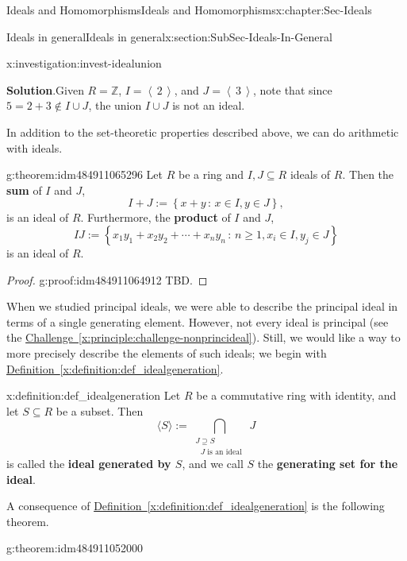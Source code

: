 \documentclass[oneside,10pt,]{book}
\newcommand{\blocktitlefont}{\relax}
\newcommand{\xreffont}{\relax}
\newcommand{\terminology}[1]{\textbf{#1}}
\numberwithin{equation}{section}
\renewcommand{\ge}{\geqslant}
\newcommand{\ideal}[1]{\left\langle\, #1 \,\right\rangle}
\newcommand{\setof}[2]{{\left\{#1\,\colon\,#2\right\}}}
\def\Z{{\mathbb Z}}
\begin{document}
\begin{chapterptx}{Ideals and Homomorphisms}{}{Ideals and Homomorphisms}{}{}{x:chapter:Sec-Ideals}
\begin{sectionptx}{Ideals in general}{}{Ideals in general}{}{}{x:section:SubSec-Ideals-In-General}
\begin{investigation}{}{x:investigation:invest-idealunion}
\par\smallskip%
\noindent\textbf{\blocktitlefont Solution}.\hypertarget{g:solution:idm484911070128}{}\quad{}Given \(R = \Z\), \(I = \ideal{2}\), and \(J = \ideal{3}\), note that since \(5 = 2 + 3\notin I\cup J\), the union \(I\cup J\) is not an ideal.%
\end{investigation}
In addition to the set-theoretic properties described above, we can do arithmetic with ideals.%
\begin{theorem}{}{}{g:theorem:idm484911065296}%
Let \(R\) be a ring and \(I,J\subseteq R\) ideals of \(R\). Then the \terminology{sum} of \(I\) and \(J\),%
\begin{equation*}
I+J := \setof{x+y}{x\in I, y\in J},
\end{equation*}
is an ideal of \(R\). Furthermore, the \terminology{product} of \(I\) and \(J\),%
\begin{equation*}
IJ := \setof{x_1 y_1 + x_2 y_2 + \cdots + x_n y_n}{n\ge 1, x_i \in I, y_j\in J}
\end{equation*}
is an ideal of \(R\).%
\end{theorem}
\begin{proof}{}{g:proof:idm484911064912}
TBD.\end{proof}
When we studied principal ideals, we were able to describe the principal ideal in terms of a single generating element. However, not every ideal is principal (see the \hyperref[x:principle:challenge-nonprincideal]{Challenge~{\xreffont\ref{x:principle:challenge-nonprincideal}}}). Still, we would like a way to more precisely describe the elements of such ideals; we begin with \hyperref[x:definition:def_idealgeneration]{Definition~{\xreffont\ref{x:definition:def_idealgeneration}}}.%
\begin{definition}{}{x:definition:def_idealgeneration}%
Let \(R\) be a commutative ring with identity, and let \(S\subseteq R\) be a subset. Then%
\begin{equation}
\langle S \rangle := \bigcap\limits_{\substack{J\supseteq S\\\text{ \(J\) is an ideal } } } J\label{x:men:eq_idealgeneratedbyset}
\end{equation}
is called the \terminology{ideal generated by \(S\)}, and we call \(S\) the \terminology{generating set for the ideal}.%
\end{definition}
A consequence of \hyperref[x:definition:def_idealgeneration]{Definition~{\xreffont\ref{x:definition:def_idealgeneration}}} is the following theorem.%
\begin{theorem}{}{}{g:theorem:idm484911052000}%

\end{theorem}
\end{sectionptx}
\end{chapterptx}
\end{document}
